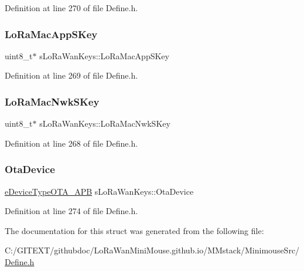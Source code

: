 Definition at line 270 of file Define.\+h.

\mbox{\label{structs_lo_ra_wan_keys_ad6b6c043645eafba66603feca886fb23}} 
\subsubsection{\texorpdfstring{Lo\+Ra\+Mac\+App\+S\+Key}{LoRaMacAppSKey}}
{\footnotesize\ttfamily uint8\+\_\+t$\ast$ s\+Lo\+Ra\+Wan\+Keys\+::\+Lo\+Ra\+Mac\+App\+S\+Key}



Definition at line 269 of file Define.\+h.

\mbox{\label{structs_lo_ra_wan_keys_a3fbacc8200a5720c10745f5eab5c4c7e}} 
\subsubsection{\texorpdfstring{Lo\+Ra\+Mac\+Nwk\+S\+Key}{LoRaMacNwkSKey}}
{\footnotesize\ttfamily uint8\+\_\+t$\ast$ s\+Lo\+Ra\+Wan\+Keys\+::\+Lo\+Ra\+Mac\+Nwk\+S\+Key}



Definition at line 268 of file Define.\+h.

\mbox{\label{structs_lo_ra_wan_keys_ac7acae00308fa51301a0b8e21cc1359e}} 
\subsubsection{\texorpdfstring{Ota\+Device}{OtaDevice}}
{\footnotesize\ttfamily \mbox{\hyperlink{_define_8h_a1e0a07faefc3dd68bbdd06f7c856cc74}{e\+Device\+Type\+O\+T\+A\+\_\+\+A\+PB}} s\+Lo\+Ra\+Wan\+Keys\+::\+Ota\+Device}



Definition at line 274 of file Define.\+h.



The documentation for this struct was generated from the following file\+:\begin{DoxyCompactItemize}
\item 
C\+:/\+G\+I\+T\+E\+X\+T/githubdoc/\+Lo\+Ra\+Wan\+Mini\+Mouse.\+github.\+io/\+M\+Mstack/\+Minimouse\+Src/\mbox{\hyperlink{_define_8h}{Define.\+h}}\end{DoxyCompactItemize}
